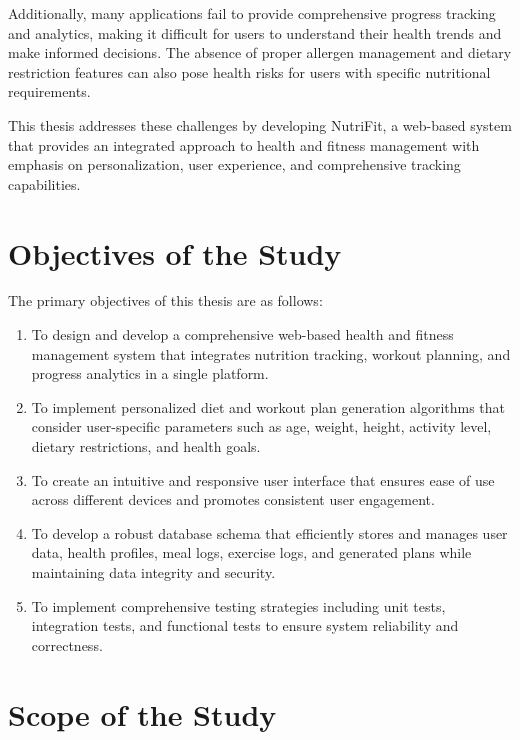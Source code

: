 Additionally, many applications fail to provide comprehensive progress tracking and analytics, making it difficult for users to understand their health trends and make informed decisions. The absence of proper allergen management and dietary restriction features can also pose health risks for users with specific nutritional requirements.

This thesis addresses these challenges by developing NutriFit, a web-based system that provides an integrated approach to health and fitness management with emphasis on personalization, user experience, and comprehensive tracking capabilities.

\section{Objectives of the Study}

The primary objectives of this thesis are as follows:

\begin{enumerate}
    \item To design and develop a comprehensive web-based health and fitness management system that integrates nutrition tracking, workout planning, and progress analytics in a single platform.
    
    \item To implement personalized diet and workout plan generation algorithms that consider user-specific parameters such as age, weight, height, activity level, dietary restrictions, and health goals.
    
    \item To create an intuitive and responsive user interface that ensures ease of use across different devices and promotes consistent user engagement.
    
    \item To develop a robust database schema that efficiently stores and manages user data, health profiles, meal logs, exercise logs, and generated plans while maintaining data integrity and security.
    
    \item To implement comprehensive testing strategies including unit tests, integration tests, and functional tests to ensure system reliability and correctness.
\end{enumerate}

\section{Scope of the Study}

